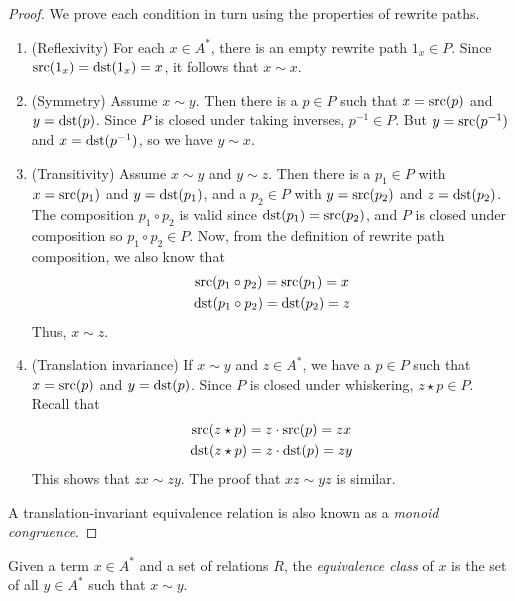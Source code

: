 \documentclass[../generics]{subfiles}
\begin{document}
\begin{proof}
We prove each condition in turn using the properties of rewrite paths.
\begin{enumerate}
\item (Reflexivity) For each $x\in A^*$, there is an empty rewrite path $1_x\in P$. Since $\operatorname{src}(1_x)=\operatorname{dst}(1_x)=x$, it follows that $x\sim x$.
\item (Symmetry) Assume $x\sim y$. Then there is a $p\in P$ such that $x=\operatorname{src}(p)$ and $y=\operatorname{dst}(p)$. Since $P$ is closed under taking inverses, $p^{-1}\in P$. But $y=\operatorname{src}(p^{-1})$ and $x=\operatorname{dst}(p^{-1})$, so we have $y\sim x$.
\item (Transitivity) Assume $x\sim y$ and $y\sim z$. Then there is a $p_1\in P$ with $x=\operatorname{src}(p_1)$ and $y=\operatorname{dst}(p_1)$, and a $p_2\in P$ with $y=\operatorname{src}(p_2)$ and $z=\operatorname{dst}(p_2)$. The composition $p_1\circ p_2$ is valid since $\operatorname{dst}(p_1)=\operatorname{src}(p_2)$, and $P$ is closed under composition so $p_1\circ p_2 \in P$. Now, from the definition of rewrite path composition, we also know that
\begin{gather*}
\operatorname{src}(p_1\circ p_2)=\operatorname{src}(p_1)=x\\
\operatorname{dst}(p_1\circ p_2)=\operatorname{dst}(p_2)=z
\end{gather*}
Thus, $x\sim z$.
\item (Translation invariance) If $x\sim y$ and $z\in A^*$, we have a $p\in P$ such that $x=\operatorname{src}(p)$ and $y=\operatorname{dst}(p)$. Since $P$ is closed under whiskering, $z\star p\in P$. Recall that
\begin{gather*}
\operatorname{src}(z\star p)=z\cdot \operatorname{src}(p)=zx\\
\operatorname{dst}(z\star p)=z\cdot \operatorname{dst}(p)=zy
\end{gather*}
This shows that $zx \sim zy$. The proof that $xz \sim yz$ is similar.
\end{enumerate}
A translation-invariant equivalence relation is also known as a \emph{monoid congruence}.
\end{proof}

Given a term $x\in A^*$ and a set of relations $R$, the \emph{equivalence class} of $x$ is the set of all $y\in A^*$ such that $x\sim y$.
\end{document}

